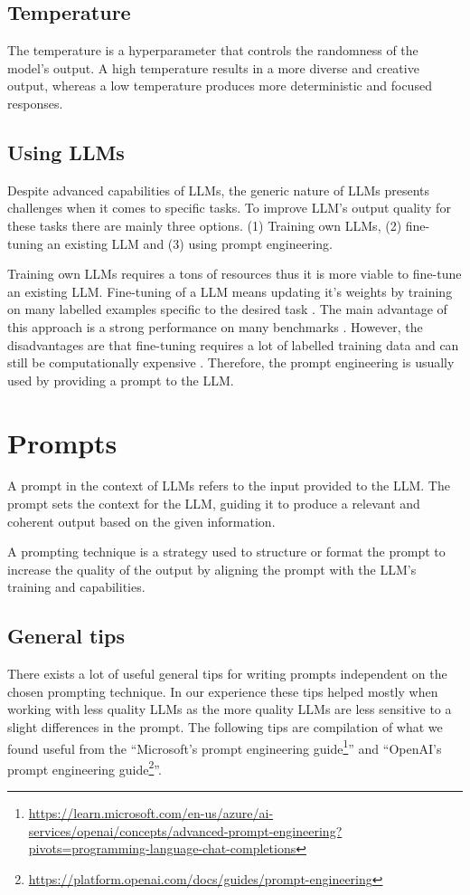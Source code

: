 \subsection{Temperature}

The temperature is a hyperparameter that controls the randomness of the model's output. A high temperature results in a more diverse and creative output, whereas a low temperature produces more deterministic and focused responses.


\subsection{Using LLMs}

Despite advanced capabilities of LLMs, the generic nature of LLMs presents challenges when it comes to specific tasks. To improve LLM's output quality for these tasks there are mainly three options. (1) Training own LLMs, (2) fine-tuning an existing LLM and (3) using prompt engineering.

Training own LLMs requires a tons of resources thus it is more viable to fine-tune an existing LLM. Fine-tuning of a LLM means updating it's weights by training on many labelled examples specific to the desired task \cite{Brown2020}. The main advantage of this approach is a strong performance on many benchmarks \cite{Brown2020}. However, the disadvantages are that fine-tuning requires a lot of labelled training data and can still be computationally expensive \cite{Brown2020}. Therefore, the prompt engineering is usually used by providing a prompt to the LLM.


\section{Prompts}

A prompt in the context of LLMs refers to the input provided to the LLM. The prompt sets the context for the LLM, guiding it to produce a relevant and coherent output based on the given information.

A prompting technique is a strategy used to structure or format the prompt to increase the quality of the output by aligning the prompt with the LLM's training and capabilities.


\subsection{General tips}
\label{prompt_general_tips}

There exists a lot of useful general tips for writing prompts independent on the chosen prompting technique. In our experience these tips helped mostly when working with less quality LLMs as the more quality LLMs are less sensitive to a slight differences in the prompt. The following tips are compilation of what we found useful from the ``Microsoft's prompt engineering guide\footnote{\url{https://learn.microsoft.com/en-us/azure/ai-services/openai/concepts/advanced-prompt-engineering?pivots=programming-language-chat-completions}}'' and ``OpenAI's prompt engineering guide\footnote{\url{https://platform.openai.com/docs/guides/prompt-engineering}}''. \\

